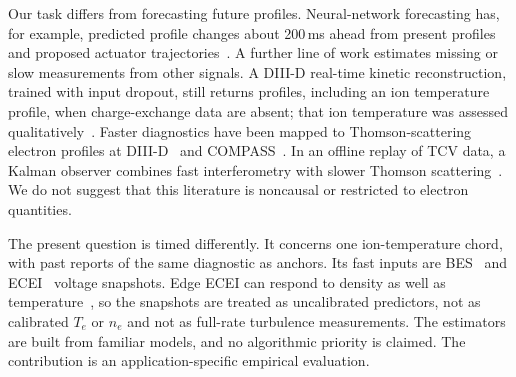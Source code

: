 Our task differs from forecasting future profiles. Neural-network forecasting has, for example, predicted profile changes about 200\,ms ahead from present profiles and proposed actuator trajectories~\citep{Abbate2021DatadrivenProfile}. A further line of work estimates missing or slow measurements from other signals. A DIII-D real-time kinetic reconstruction, trained with input dropout, still returns profiles, including an ion temperature profile, when charge-exchange data are absent; that ion temperature was assessed qualitatively~\citep{Shousha2023MachineLearningbased}. Faster diagnostics have been mapped to Thomson-scattering electron profiles at DIII-D~\citep{Jalalvand2025MultimodalSuperresolution} and COMPASS~\citep{Imrek2026TemporalSuperresolution}. In an offline replay of TCV data, a Kalman observer combines fast interferometry with slower Thomson scattering~\citep{Pastore2023ModelBased}. We do not suggest that this literature is noncausal or restricted to electron quantities.

The present question is timed differently. It concerns one ion-temperature chord, with past reports of the same diagnostic as anchors. Its fast inputs are BES~\citep{Lampert2015CombinedHydrogen} and ECEI~\citep{Yun2014Quasi3d} voltage snapshots. Edge ECEI can respond to density as well as temperature~\citep{Vanovac2018EffectsDensity}, so the snapshots are treated as uncalibrated predictors, not as calibrated $T_e$ or $n_e$ and not as full-rate turbulence measurements. The estimators are built from familiar models, and no algorithmic priority is claimed. The contribution is an application-specific empirical evaluation.

